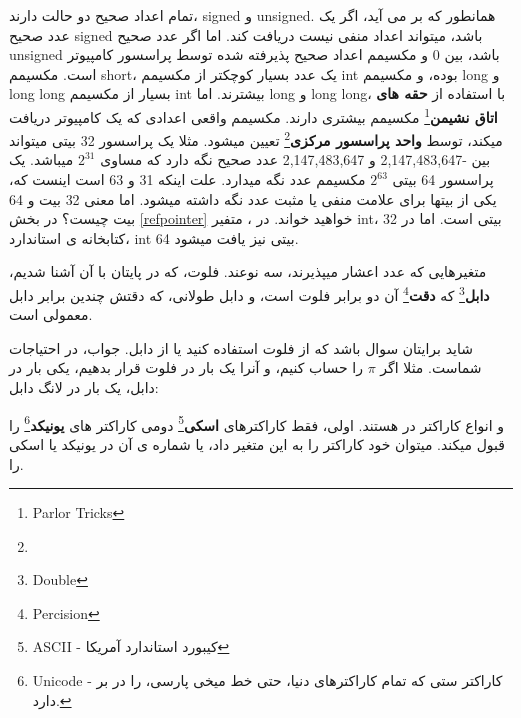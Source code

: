 \documentclass[14pt,a4paper]{memoir}
\begin{document}
	 
	 
	 تمام اعداد صحیح دو حالت دارند، signed و unsigned. همانطور که بر می آید، اگر یک عدد صحیح signed باشد، میتواند اعداد منفی نیست دریافت کند. اما اگر عدد صحیح unsigned باشد، بین 0 و مکسیمم اعداد صحیح پذیرفته شده توسط پراسسور کامپیوتر است. مکسیمم short، یک عدد بسیار کوچکتر از مکسیمم int بوده، و مکسیمم long و long long بسیار از مکسیمم int بیشترند. اما long و long long، با استفاده از \textbf{حقه های اتاق نشیمن}\footnote{Parlor Tricks} مکسیمم بیشتری دارند. مکسیمم واقعی اعدادی که یک کامپیوتر دریافت میکند، توسط \textbf{واحد پراسسور مرکزی}\footnote{} تعیین میشود. مثلا یک پراسسور 32 بیتی میتواند بین   -2,147,483,647 و 2,147,483,647 عدد صحیح نگه دارد که مساوی $ 2^{31} $ میباشد. یک پراسسور 64 بیتی $ 2^{63} $ مکسیمم عدد نگه میدارد. علت اینکه 31 و 63 است اینست که، یکی از بیتها برای علامت منفی یا مثبت عدد نگه داشته میشود. اما معنی 32 بیت و 64 بیت چیست؟ در بخش \ref{refpointer} خواهید خواند. در ، متفیر int، 32 بیتی است. اما در کتابخانه ی استاندارد، int 64 بیتی نیز یافت میشود.
	 
	 متغیرهایی که عدد اعشار میپذیرند،  سه نوعند. فلوت، که در پایتان با آن آشنا شدیم، \textbf{دابل}\footnote{Double} که \textbf{دقت}\footnote{Percision} آن دو برابر فلوت است، و دابل طولانی، که دقتش چندین برابر دابل معمولی است.
	 
	 \begin{tip}
	 	شاید برایتان سوال باشد که از فلوت استفاده کنید یا از دابل. جواب، در احتیاجات شماست. مثلا اگر $ \pi $ را حساب کنیم، و آنرا یک بار در فلوت قرار بدهیم، یکی بار در دابل، یک بار در لانگ دابل:	 		 	 	 	 \begin{latin}
	 		
	 	\end{latin}
	 \end{tip}
	 
	 
	 
	  و  انواع کاراکتر در  هستند. اولی، فقط کاراکترهای \textbf{اسکی}\footnote{ASCII - کیبورد استاندارد آمریکا} دومی کاراکتر های \textbf{یونیکد}\footnote{Unicode - کاراکتر ستی که تمام کاراکترهای دنیا، حتی خط میخی پارسی، را در بر دارد.} را قبول میکند. میتوان خود کاراکتر را به این متغیر داد، یا شماره ی آن در یونیکد یا اسکی را.
	 
\end{document}
